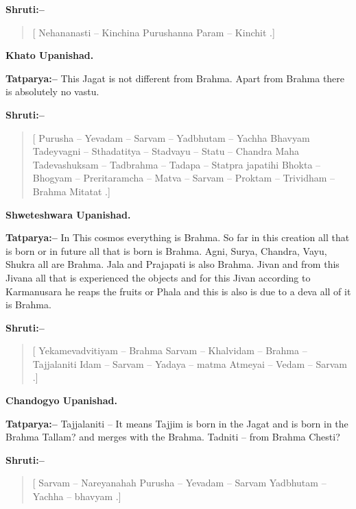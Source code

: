 \textbf{Shruti:–}

\begin{verse}
[ Nehananasti – Kinchina  Purushanna Param – Kinchit .]
\end{verse}

\begin{flushright}
\textbf{Khato Upanishad.}
\end{flushright}

\textbf{Tatparya:–} This Jagat is not different from Brahma. Apart from Brahma there is absolutely no vastu.

\textbf{Shruti:–}

\begin{verse}
[ Purusha – Yevadam – Sarvam – Yadbhutam – Yachha Bhavyam  Tadeyvagni – Sthadatitya – Stadvayu – Statu – Chandra Maha  Tadevashuksam – Tadbrahma – Tadapa – Statpra japatihi  Bhokta – Bhogyam – Preritaramcha – Matva – Sarvam – Proktam – Trividham – Brahma Mitatat .]
\end{verse}

\begin{flushright}
\textbf{Shweteshwara Upanishad.}
\end{flushright}

\textbf{Tatparya:–} In This cosmos everything is Brahma. So far in this creation all that is born or in future all that is born is Brahma. Agni, Surya, Chandra, Vayu, Shukra all are Brahma. Jala and Prajapati is also Brahma. Jivan and from this Jivana all that is experienced the objects and for this Jivan according to Karmanusara he reaps the fruits or Phala and this is also is due to a deva all of it is Brahma.

\textbf{Shruti:–}

\begin{verse}
[ Yekamevadvitiyam – Brahma  Sarvam – Khalvidam – Brahma – Tajjalaniti Idam – Sarvam – Yadaya – matma  Atmeyai – Vedam – Sarvam .]
\end{verse}

\begin{flushright}
\textbf{Chandogyo Upanishad.}
\end{flushright}

\textbf{Tatparya:–} Tajjalaniti – It means Tajjim is born in the Jagat and is born in the Brahma Tallam? and merges with the Brahma. Tadniti – from Brahma Chesti?

\textbf{Shruti:–}

\begin{verse}
[ Sarvam – Nareyanahah  Purusha – Yevadam – Sarvam  Yadbhutam – Yachha – bhavyam .]
\end{verse}


